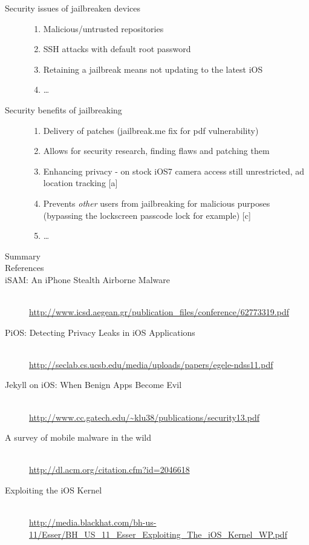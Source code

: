 \documentclass[12pt]{article}
\begin{document}
\begin{description}
 \item[Security issues of jailbreaken devices] \hfill 
     	\begin{enumerate}
	\item Malicious/untrusted repositories
	\item SSH attacks with default root password
	\item Retaining a jailbreak means not updating to the latest iOS
	\item \ldots
	\end{enumerate}

 \item[Security benefits of jailbreaking] \hfill 
     	\begin{enumerate}
	\item Delivery of patches (jailbreak.me fix for pdf vulnerability)
	\item Allows for security research, finding flaws and patching them
	\item Enhancing privacy - on stock iOS7 camera access still unrestricted, ad location tracking [a]
	\item Prevents \emph{other} users from jailbreaking for malicious purposes (bypassing the lockscreen passcode lock for example) [c]
	\item \ldots
	\end{enumerate}
	
 \item[Summary] \hfill 
 

\item [References] 

\item [iSAM: An iPhone Stealth Airborne Malware] \hfill \\ \url{http://www.icsd.aegean.gr/publication_files/conference/62773319.pdf}
\item [PiOS: Detecting Privacy Leaks in iOS Applications] \hfill \\ \url{http://seclab.cs.ucsb.edu/media/uploads/papers/egele-ndss11.pdf}
\item [Jekyll on iOS: When Benign Apps Become Evil] \hfill \\ \url{http://www.cc.gatech.edu/~klu38/publications/security13.pdf}
\item [A survey of mobile malware in the wild] \hfill \\ \url{http://dl.acm.org/citation.cfm?id=2046618}
\item [Exploiting the iOS Kernel] \hfill \\ \url{http://media.blackhat.com/bh-us-11/Esser/BH_US_11_Esser_Exploiting_The_iOS_Kernel_WP.pdf}


\end{description}
\end{document}
